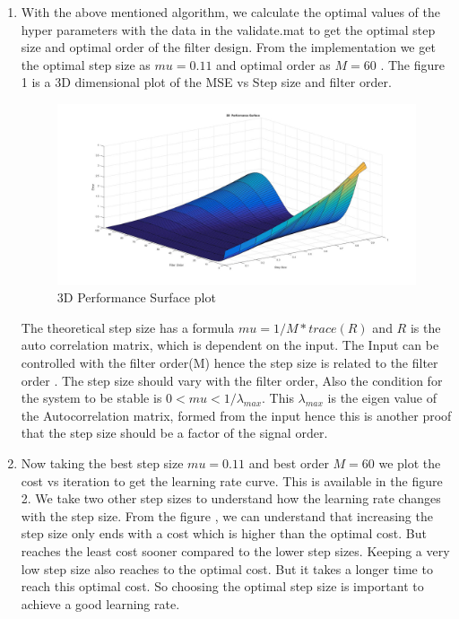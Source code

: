 \documentclass[10pt, letterpaper]{article}
\begin{document}
\begin{enumerate}
\item With the above mentioned algorithm, we calculate the optimal values of the hyper parameters with the data in the validate.mat to get the optimal step size and optimal order of the filter design. From the implementation we get the optimal step size as $mu = 0.11$ and optimal order as $M=60$ . The figure 1 is a 3D dimensional plot of the MSE vs Step size and filter order. \\

\begin{figure}
\centering
\includegraphics[scale=0.25]{3d_performanceSurface-Training.jpg}
\caption{3D Performance Surface plot}
\end{figure}

The theoretical step size has a formula  $ mu = 1 /M*trace(R) $ and $R$ is the auto correlation matrix, which is dependent on the input. The Input can be controlled with the filter order(M) hence the step size is related to the filter order . The step size should vary with the filter order, Also the condition for the system to be stable is $0<mu<1/\lambda_{max}$. This $\lambda_{max}$ is the eigen value of the Autocorrelation matrix, formed from the input hence this is another proof that the step size should be a factor of the signal order.

\item Now taking the best step size $mu=0.11$ and best order $M=60$ we plot the cost vs iteration to get the learning rate curve. This is available in the figure 2.  We take two other step sizes to understand how the learning rate changes with the step size. From the figure , we can understand that increasing the step size only ends with a cost which is higher than the optimal cost. But reaches the least cost sooner compared to the lower step sizes. Keeping a very low step size also reaches to the optimal cost. But it takes a longer time to reach this optimal cost. So choosing the optimal step size is important to achieve a good learning rate. 



\end{enumerate}
\end{document}

